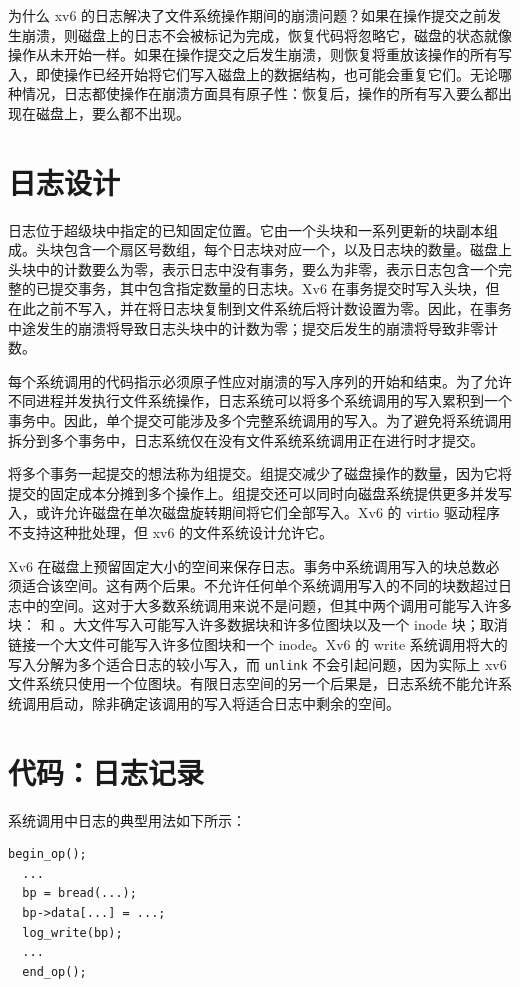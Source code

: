 为什么 xv6 的日志解决了文件系统操作期间的崩溃问题？如果在操作提交之前发生崩溃，则磁盘上的日志不会被标记为完成，恢复代码将忽略它，磁盘的状态就像操作从未开始一样。如果在操作提交之后发生崩溃，则恢复将重放该操作的所有写入，即使操作已经开始将它们写入磁盘上的数据结构，也可能会重复它们。无论哪种情况，日志都使操作在崩溃方面具有原子性：恢复后，操作的所有写入要么都出现在磁盘上，要么都不出现。
\section{日志设计}

日志位于超级块中指定的已知固定位置。它由一个头块和一系列更新的块副本组成。头块包含一个扇区号数组，每个日志块对应一个，以及日志块的数量。磁盘上头块中的计数要么为零，表示日志中没有事务，要么为非零，表示日志包含一个完整的已提交事务，其中包含指定数量的日志块。Xv6 在事务提交时写入头块，但在此之前不写入，并在将日志块复制到文件系统后将计数设置为零。因此，在事务中途发生的崩溃将导致日志头块中的计数为零；提交后发生的崩溃将导致非零计数。

每个系统调用的代码指示必须原子性应对崩溃的写入序列的开始和结束。为了允许不同进程并发执行文件系统操作，日志系统可以将多个系统调用的写入累积到一个事务中。因此，单个提交可能涉及多个完整系统调用的写入。为了避免将系统调用拆分到多个事务中，日志系统仅在没有文件系统系统调用正在进行时才提交。

将多个事务一起提交的想法称为组提交。组提交减少了磁盘操作的数量，因为它将提交的固定成本分摊到多个操作上。组提交还可以同时向磁盘系统提供更多并发写入，或许允许磁盘在单次磁盘旋转期间将它们全部写入。Xv6 的 virtio 驱动程序不支持这种批处理，但 xv6 的文件系统设计允许它。

Xv6 在磁盘上预留固定大小的空间来保存日志。事务中系统调用写入的块总数必须适合该空间。这有两个后果。不允许任何单个系统调用写入的不同的块数超过日志中的空间。这对于大多数系统调用来说不是问题，但其中两个调用可能写入许多块： 和 。大文件写入可能写入许多数据块和许多位图块以及一个 inode 块；取消链接一个大文件可能写入许多位图块和一个 inode。Xv6 的 write 系统调用将大的写入分解为多个适合日志的较小写入，而 \lstinline{unlink} 不会引起问题，因为实际上 xv6 文件系统只使用一个位图块。有限日志空间的另一个后果是，日志系统不能允许系统调用启动，除非确定该调用的写入将适合日志中剩余的空间。
\section{代码：日志记录}

系统调用中日志的典型用法如下所示：
\begin{lstlisting}[]
  begin_op();
  ...
  bp = bread(...);
  bp->data[...] = ...;
  log_write(bp);
  ...
  end_op();
\end{lstlisting}

